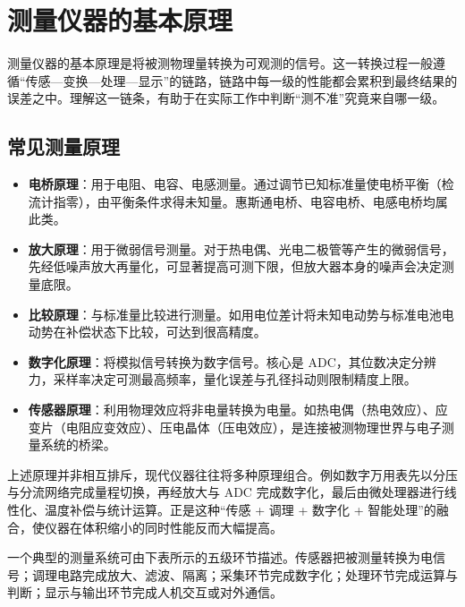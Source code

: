 \section{测量仪器的基本原理}
\label{sec:measurement_principles}

测量仪器的基本原理是将被测物理量转换为可观测的信号。这一转换过程一般遵循“传感—变换—处理—显示”的链路，链路中每一级的性能都会累积到最终结果的误差之中。理解这一链条，有助于在实际工作中判断“测不准”究竟来自哪一级。

\subsection{常见测量原理}

\begin{itemize}
    \item \textbf{电桥原理}：用于电阻、电容、电感测量。通过调节已知标准量使电桥平衡（检流计指零），由平衡条件求得未知量。惠斯通电桥、电容电桥、电感电桥均属此类。
    \item \textbf{放大原理}：用于微弱信号测量。对于热电偶、光电二极管等产生的微弱信号，先经低噪声放大再量化，可显著提高可测下限，但放大器本身的噪声会决定测量底限。
    \item \textbf{比较原理}：与标准量比较进行测量。如用电位差计将未知电动势与标准电池电动势在补偿状态下比较，可达到很高精度。
    \item \textbf{数字化原理}：将模拟信号转换为数字信号。核心是 ADC，其位数决定分辨力，采样率决定可测最高频率，量化误差与孔径抖动则限制精度上限。
    \item \textbf{传感器原理}：利用物理效应将非电量转换为电量。如热电偶（热电效应）、应变片（电阻应变效应）、压电晶体（压电效应），是连接被测物理世界与电子测量系统的桥梁。
\end{itemize}

上述原理并非相互排斥，现代仪器往往将多种原理组合。例如数字万用表先以分压与分流网络完成量程切换，再经放大与 ADC 完成数字化，最后由微处理器进行线性化、温度补偿与统计运算。正是这种“传感 + 调理 + 数字化 + 智能处理”的融合，使仪器在体积缩小的同时性能反而大幅提高。

一个典型的测量系统可由下表所示的五级环节描述。传感器把被测量转换为电信号；调理电路完成放大、滤波、隔离；采集环节完成数字化；处理环节完成运算与判断；显示与输出环节完成人机交互或对外通信。

